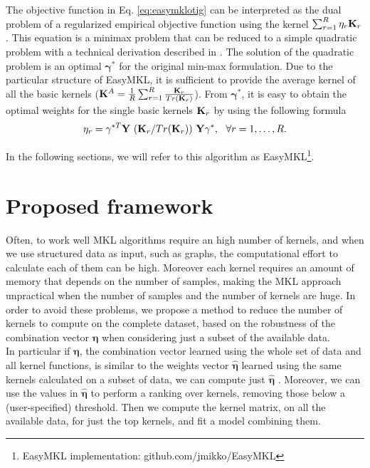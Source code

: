 \documentclass{esannV2}
\newcommand{\yy}{{\bf y}}
\newcommand{\KK}{{\bf K}}
\newcommand{\YY}{{\bf Y}}
\newcommand{\XX}{{\bf X}}
\newcommand{\1}{{\bf 1}}
\newcommand{\ggamma}{\pmb{\gamma}}
\begin{document}
The objective function in Eq. \ref{eq:easymklotig} can be interpreted as the dual problem of a regularized empirical objective function using the kernel $\sum_{r=1}^R \eta_r \KK_r$. This equation is a minimax problem that can be reduced  to a simple quadratic problem with a technical derivation described  in \cite{Aiolli2015}. The solution of the quadratic problem is an optimal $\ggamma^*$ for the original min-max formulation. Due to the particular structure of EasyMKL, it is sufficient to provide the average kernel of all the basic kernels ($\KK^A = \frac{1}{R} \sum_{r=1}^R \frac{\KK_r}{Tr(\KK_r)}$). From $\ggamma^*$, it is easy to obtain the optimal weights for the single basic kernels $\KK_r$ by using the following formula
\begin{equation}
\label{eq:easyeta}
	\eta_r = \gamma^{*T} \YY \,\, (\KK_r/Tr(\KK_r)) \,\, \YY \gamma^*, \,\,\,\, \forall r=1,\dots,R.
\end{equation}

In the following sections, we will refer to this algorithm as EasyMKL\footnote{EasyMKL implementation: github.com/jmikko/EasyMKL}.


\section{Proposed framework}
Often, to work well MKL algorithms require an high number of kernels, and when we use structured data as input, such as graphs, the computational effort to calculate each of them can be high. Moreover each kernel requires an amount of memory that depends on the number of samples, making the MKL approach unpractical when the number of samples and the number of kernels are huge.
In order to avoid these problems, we propose a method to reduce the number of kernels to compute on the complete dataset, based on the robustness of the combination vector $\boldsymbol{\eta}$ when considering just a subset of the available data.\\
In particular if $\boldsymbol{\eta}$, the combination vector learned using the whole set of data and all kernel functions, is similar to the weights vector $\hat{\boldsymbol{\eta}}$ learned using the same kernels calculated on a subset of data, we can compute just $\hat{\boldsymbol{\eta}}$ .
Moreover, we can use the values in $\hat{\boldsymbol{\eta}}$ to perform a ranking over kernels, removing those below a (user-specified) threshold.
Then we compute the kernel matrix, on all the available data, for just the top kernels, and fit a model combining them.
\end{document}
